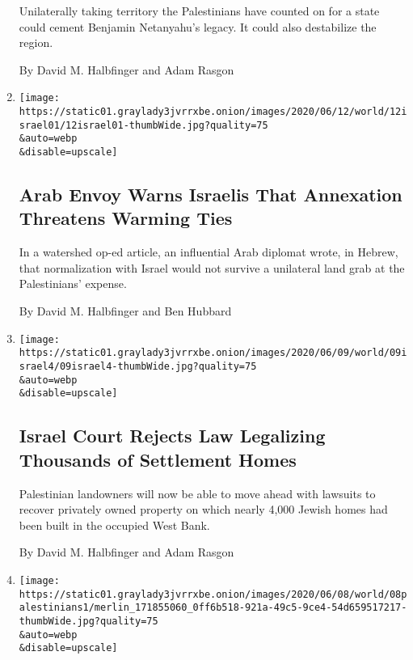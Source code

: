 \begin{enumerate}
  Unilaterally taking territory the Palestinians have counted on for a
  state could cement Benjamin Netanyahu's legacy. It could also
  destabilize the region.

  By David M. Halbfinger and Adam Rasgon
\item
  \href{/2020/06/12/world/middleeast/west-bank-annexation-israel-uae.html}{}

  \texttt{[image: https://static01.graylady3jvrrxbe.onion/images/2020/06/12/world/12israel01/12israel01-thumbWide.jpg?quality=75\\\&auto=webp\\\&disable=upscale]}

  \hypertarget{arab-envoy-warns-israelis-that-annexation-threatens-warming-ties}{%
  \subsection{Arab Envoy Warns Israelis That Annexation Threatens
  Warming
  Ties}\label{arab-envoy-warns-israelis-that-annexation-threatens-warming-ties}}

  In a watershed op-ed article, an influential Arab diplomat wrote, in
  Hebrew, that normalization with Israel would not survive a unilateral
  land grab at the Palestinians' expense.

  By David M. Halbfinger and Ben Hubbard
\item
  \href{/2020/06/09/world/middleeast/israel-supreme-court-west-bank-settlements.html}{}

  \texttt{[image: https://static01.graylady3jvrrxbe.onion/images/2020/06/09/world/09israel4/09israel4-thumbWide.jpg?quality=75\\\&auto=webp\\\&disable=upscale]}

  \hypertarget{israel-court-rejects-law-legalizing-thousands-of-settlement-homes}{%
  \subsection{Israel Court Rejects Law Legalizing Thousands of
  Settlement
  Homes}\label{israel-court-rejects-law-legalizing-thousands-of-settlement-homes}}

  Palestinian landowners will now be able to move ahead with lawsuits to
  recover privately owned property on which nearly 4,000 Jewish homes
  had been built in the occupied West Bank.

  By David M. Halbfinger and Adam Rasgon
\item
  \href{/2020/06/08/world/middleeast/palestinian-authority-annexation-israel.html}{}

  \texttt{[image: https://static01.graylady3jvrrxbe.onion/images/2020/06/08/world/08palestinians1/merlin\_171855060\_0ff6b518-921a-49c5-9ce4-54d659517217-thumbWide.jpg?quality=75\\\&auto=webp\\\&disable=upscale]}


\end{enumerate}
